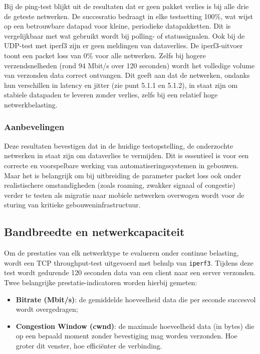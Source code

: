 Bij de ping-test blijkt uit de resultaten dat er geen pakket verlies is  bij alle drie de geteste netwerken. De succesratio bedraagt in elke testsetting 100\%, wat wijst op een betrouwbare datapad voor kleine, periodieke datapakketten. Dit is vergelijkbaar met wat gebruikt wordt bij polling- of statussignalen.
Ook bij de UDP-test met iperf3 zijn er geen meldingen van dataverlies. De iperf3-uitvoer toont een packet loss van 0\% voor alle netwerken. Zelfs bij hogere verzendsnelheden (rond 94 Mbit/s over 120 seconden) wordt het volledige volume van verzonden data correct ontvangen. Dit geeft aan dat de netwerken, ondanks hun verschillen in latency en jitter (zie punt 5.1.1 en 5.1.2), in staat zijn om stabiele datapaden te leveren zonder verlies, zelfs bij een relatief hoge netwerkbelasting.


\subsubsection{Aanbevelingen}
Deze resultaten bevestigen dat in de huidige testopstelling, de onderzochte netwerken in staat zijn om dataverlies te vermijden. Dit is essentieel is voor een correcte en voorspelbare werking van automatiseringssystemen in gebouwen.
Maar het is belangrijk om bij uitbreiding de parameter packet loss ook onder realistischere omstandigheden (zoals roaming, zwakker signaal of congestie) verder te testen als migratie naar mobiele netwerken overwogen wordt voor de sturing van kritieke gebouweninfrastructuur.



\subsection{Bandbreedte en netwerkcapaciteit}
Om de prestaties van elk netwerktype te evalueren onder continue belasting, wordt een TCP throughput-test uitgevoerd met behulp van \texttt{iperf3}. Tijdens deze test wordt gedurende 120 seconden data van een client naar een server verzonden. Twee belangrijke prestatie-indicatoren worden hierbij gemeten:

\begin{itemize}
    \item \textbf{Bitrate (Mbit/s)}: de gemiddelde hoeveelheid data die per seconde succesvol wordt overgedragen;
    \item \textbf{Congestion Window (cwnd)}: de maximale hoeveelheid data (in bytes) die op een bepaald moment zonder bevestiging mag worden verzonden. Hoe groter dit venster, hoe efficiënter de verbinding.
\end{itemize}

